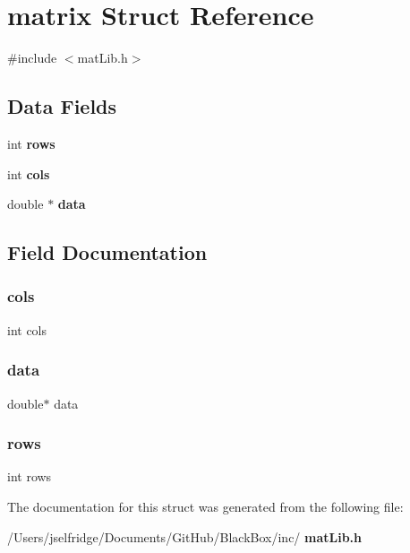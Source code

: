\section{matrix Struct Reference}
\label{structmatrix}


{\ttfamily \#include $<$mat\+Lib.\+h$>$}

\subsection*{Data Fields}
\begin{DoxyCompactItemize}
\item 
int \textbf{ rows}
\item 
int \textbf{ cols}
\item 
double $\ast$ \textbf{ data}
\end{DoxyCompactItemize}


\subsection{Field Documentation}
\mbox{\label{structmatrix_a4407a60bc4387adae24cee658711f2d9}} 
\subsubsection{cols}
{\footnotesize\ttfamily int cols}

\mbox{\label{structmatrix_a23436a7a2b44939627b59df11be7ad75}} 
\subsubsection{data}
{\footnotesize\ttfamily double$\ast$ data}

\mbox{\label{structmatrix_a061459acc9e078fa4699e0e349887215}} 
\subsubsection{rows}
{\footnotesize\ttfamily int rows}



The documentation for this struct was generated from the following file\+:\begin{DoxyCompactItemize}
\item 
/\+Users/jselfridge/\+Documents/\+Git\+Hub/\+Black\+Box/inc/\textbf{ mat\+Lib.\+h}\end{DoxyCompactItemize}
